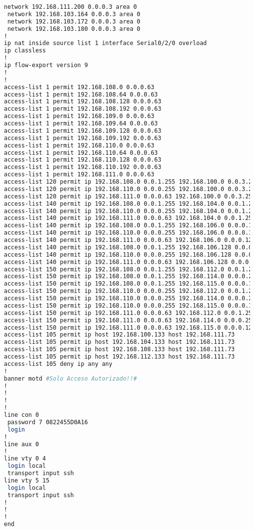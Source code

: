 \begin{lstlisting}[language=Bash, caption={Configuración Completa Router Inca}]
 network 192.168.111.200 0.0.0.3 area 0
 network 192.168.103.164 0.0.0.3 area 0
 network 192.168.103.172 0.0.0.3 area 0
 network 192.168.103.180 0.0.0.3 area 0
!
ip nat inside source list 1 interface Serial0/2/0 overload
ip classless
!
ip flow-export version 9
!
!
access-list 1 permit 192.168.108.0 0.0.0.63
access-list 1 permit 192.168.108.64 0.0.0.63
access-list 1 permit 192.168.108.128 0.0.0.63
access-list 1 permit 192.168.108.192 0.0.0.63
access-list 1 permit 192.168.109.0 0.0.0.63
access-list 1 permit 192.168.109.64 0.0.0.63
access-list 1 permit 192.168.109.128 0.0.0.63
access-list 1 permit 192.168.109.192 0.0.0.63
access-list 1 permit 192.168.110.0 0.0.0.63
access-list 1 permit 192.168.110.64 0.0.0.63
access-list 1 permit 192.168.110.128 0.0.0.63
access-list 1 permit 192.168.110.192 0.0.0.63
access-list 1 permit 192.168.111.0 0.0.0.63
access-list 120 permit ip 192.168.108.0 0.0.1.255 192.168.100.0 0.0.3.255
access-list 120 permit ip 192.168.110.0 0.0.0.255 192.168.100.0 0.0.3.255
access-list 120 permit ip 192.168.111.0 0.0.0.63 192.168.100.0 0.0.3.255
access-list 140 permit ip 192.168.108.0 0.0.1.255 192.168.104.0 0.0.1.255
access-list 140 permit ip 192.168.110.0 0.0.0.255 192.168.104.0 0.0.1.255
access-list 140 permit ip 192.168.111.0 0.0.0.63 192.168.104.0 0.0.1.255
access-list 140 permit ip 192.168.108.0 0.0.1.255 192.168.106.0 0.0.0.127
access-list 140 permit ip 192.168.110.0 0.0.0.255 192.168.106.0 0.0.0.127
access-list 140 permit ip 192.168.111.0 0.0.0.63 192.168.106.0 0.0.0.127
access-list 140 permit ip 192.168.108.0 0.0.1.255 192.168.106.128 0.0.0.63
access-list 140 permit ip 192.168.110.0 0.0.0.255 192.168.106.128 0.0.0.63
access-list 140 permit ip 192.168.111.0 0.0.0.63 192.168.106.128 0.0.0.63
access-list 150 permit ip 192.168.108.0 0.0.1.255 192.168.112.0 0.0.1.255
access-list 150 permit ip 192.168.108.0 0.0.1.255 192.168.114.0 0.0.0.255
access-list 150 permit ip 192.168.108.0 0.0.1.255 192.168.115.0 0.0.0.127
access-list 150 permit ip 192.168.110.0 0.0.0.255 192.168.112.0 0.0.1.255
access-list 150 permit ip 192.168.110.0 0.0.0.255 192.168.114.0 0.0.0.255
access-list 150 permit ip 192.168.110.0 0.0.0.255 192.168.115.0 0.0.0.127
access-list 150 permit ip 192.168.111.0 0.0.0.63 192.168.112.0 0.0.1.255
access-list 150 permit ip 192.168.111.0 0.0.0.63 192.168.114.0 0.0.0.255
access-list 150 permit ip 192.168.111.0 0.0.0.63 192.168.115.0 0.0.0.127
access-list 105 permit ip host 192.168.100.133 host 192.168.111.73
access-list 105 permit ip host 192.168.104.133 host 192.168.111.73
access-list 105 permit ip host 192.168.108.133 host 192.168.111.73
access-list 105 permit ip host 192.168.112.133 host 192.168.111.73
access-list 105 deny ip any any
!
banner motd #Solo Acceso Autorizado!!#
!
!
!
!
line con 0
 password 7 0822455D0A16
 login
!
line aux 0
!
line vty 0 4
 login local
 transport input ssh
line vty 5 15
 login local
 transport input ssh
!
!
!
end


\end{lstlisting}

